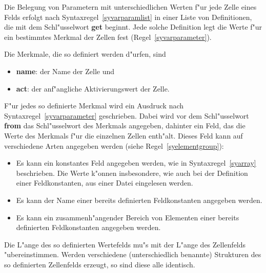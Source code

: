 Die Belegung von Parametern mit unterschiedlichen Werten f"ur jede
Zelle eines Felds erfolgt nach Syntaxregel~\ref{syvarparamlist} in
einer Liste von Definitionen, die mit dem Schl"usselwort {\bf get}
 beginnt. Jede solche Definition legt die Werte f"ur ein
bestimmtes Merkmal der Zellen fest (Regel~\ref{syvarparameter}).

Die Merkmale, die so definiert werden d"urfen, sind
\begin{itemize}
  \item {\bf name}: der Name der Zelle und
  \item {\bf act}: der anf"angliche
Aktivierungswert der Zelle. 
\end{itemize}

F"ur jedes so definierte Merkmal wird ein Ausdruck nach
Syntaxregel~\ref{syvarparameter} geschrieben. Dabei wird vor dem
Schl"usselwort {\bf from} das Schl"usselwort des Merkmals
angegeben, dahinter ein Feld, das die Werte des Merkmals
f"ur die einzelnen Zellen enth"alt. Dieses Feld kann auf verschiedene
Arten angegeben werden (siehe Regel~\ref{syelementgroup}):

\begin{itemize}
  \item Es kann ein konstantes Feld angegeben werden, wie in Syntaxregel~\ref{syarray}
	beschrieben. Die Werte k"onnen insbesondere, wie auch bei der Definition einer
	Feldkonstanten, aus einer Datei eingelesen werden.
  \item Es kann der Name einer bereits definierten Feldkonstanten angegeben werden.
  \item Es kann ein zusammenh"angender Bereich von
	Elementen einer bereits definierten Feldkonstanten angegeben werden. 
\end{itemize}

 Die L"ange des so definierten Wertefelds mu"s mit der
L"ange des Zellenfelds "ubereinstimmen.
Werden verschiedene (unterschiedlich benannte)
Strukturen des so definierten
Zellenfelds erzeugt, so sind diese alle identisch.

